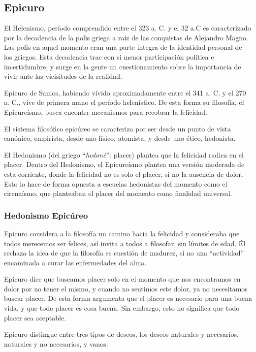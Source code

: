 \documentclass{article}
\begin{document}
\subsection{Epicuro}

El Helenismo, período comprendido entre el 323 a. C. y el 32 a.C es caracterizado por la decadencia de la polis griega a raíz de las conquistas de Alejandro Magno. Las polis en aquel momento eran una parte integra de la identidad personal de los griegos. Esta decadencia trae con si menor participación política e incertidumbre, y surge en la gente un cuestionamiento sobre la importancia de vivir ante las vicisitudes de la realidad. 

Epicuro de Samos, habiendo vivido aproximadamente entre el 341 a. C. y el 270 a. C., vive de primera mano el período helenistico. De esta forma su filosofía, el Epicureísmo, busca encontrr mecanismos para recobrar la felicidad.

El sistema filosófico epicúreo se caracteriza por ser desde un punto de vista canónico, empirista, desde uno físico, atomista, y desde uno ético, hedonista.

El Hedonismo (del griego ``\textit{hedoné}'': placer) plantea que la felicidad radica en el placer. Dentro del Hedonismo, el Epicureísmo plantea una versión moderada de esta corriente, donde la felicidad no es solo el placer, si no la ausencia de dolor. Esto lo hace de forma opuesta a escuelas hedonistas del momento como el cirenaísmo, que planteaban el placer del momento como finalidad universal.

\subsubsection{Hedonismo Epicúreo}

Epicuro considera a la filosofía un camino hacia la felicidad y consideraba que todos merecemos ser felices, así invita a todos a filosofar, sin límites de edad. Él rechaza la idea de que la filosofía es cuestión de madurez, si no una  ``actividad'' encaminada a curar las enfermedades del alma.

Epicuro dice que buscamos placer solo en el momento que nos encontramos en dolor por no tener el mismo, y cuando no sentimos este dolor, ya no necesitamos buscar placer. De esta forma argumenta que el placer es necesario para una buena vida, y que todo placer es cosa buena. Sin embargo, esto no significa que todo placer sea aceptable.

Epicuro distingue entre tres tipos de deseos, los deseos naturales y necesarios, naturales y no necesarios, y vanos.
\end{document}

